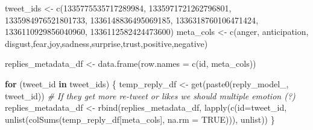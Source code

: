 \documentclass[
]{article}
\newenvironment{Shaded}{\begin{snugshade}}{\end{snugshade}}
\newcommand{\AttributeTok}[1]{\textcolor[rgb]{0.77,0.63,0.00}{#1}}
\newcommand{\CommentTok}[1]{\textcolor[rgb]{0.56,0.35,0.01}{\textit{#1}}}
\newcommand{\ConstantTok}[1]{\textcolor[rgb]{0.00,0.00,0.00}{#1}}
\newcommand{\ControlFlowTok}[1]{\textcolor[rgb]{0.13,0.29,0.53}{\textbf{#1}}}
\newcommand{\FunctionTok}[1]{\textcolor[rgb]{0.00,0.00,0.00}{#1}}
\newcommand{\NormalTok}[1]{#1}
\newcommand{\OtherTok}[1]{\textcolor[rgb]{0.56,0.35,0.01}{#1}}
\newcommand{\StringTok}[1]{\textcolor[rgb]{0.31,0.60,0.02}{#1}}
\begin{document}
\begin{Shaded}
\begin{Highlighting}[]
\NormalTok{tweet\_ids }\OtherTok{\textless{}{-}} \FunctionTok{c}\NormalTok{(}\StringTok{\textquotesingle{}1335775535717289984\textquotesingle{}}\NormalTok{, }\StringTok{\textquotesingle{}1335971721262796801\textquotesingle{}}\NormalTok{, }\StringTok{\textquotesingle{}1335984976521801733\textquotesingle{}}\NormalTok{, }\StringTok{\textquotesingle{}1336148836495069185\textquotesingle{}}\NormalTok{, }\StringTok{\textquotesingle{}1336318760106471424\textquotesingle{}}\NormalTok{, }\StringTok{\textquotesingle{}1336110929856040960\textquotesingle{}}\NormalTok{, }\StringTok{\textquotesingle{}1336112582424473600\textquotesingle{}}\NormalTok{)}
\NormalTok{meta\_cols }\OtherTok{\textless{}{-}} \FunctionTok{c}\NormalTok{(}\StringTok{\textquotesingle{}anger\textquotesingle{}}\NormalTok{, }\StringTok{\textquotesingle{}anticipation\textquotesingle{}}\NormalTok{, }\StringTok{\textquotesingle{}disgust\textquotesingle{}}\NormalTok{,}\StringTok{\textquotesingle{}fear\textquotesingle{}}\NormalTok{,}\StringTok{\textquotesingle{}joy\textquotesingle{}}\NormalTok{,}\StringTok{\textquotesingle{}sadness\textquotesingle{}}\NormalTok{,}\StringTok{\textquotesingle{}surprise\textquotesingle{}}\NormalTok{,}\StringTok{\textquotesingle{}trust\textquotesingle{}}\NormalTok{,}\StringTok{\textquotesingle{}positive\textquotesingle{}}\NormalTok{,}\StringTok{\textquotesingle{}negative\textquotesingle{}}\NormalTok{)}


\NormalTok{replies\_metadata\_df }\OtherTok{\textless{}{-}} \FunctionTok{data.frame}\NormalTok{(}\AttributeTok{row.names =} \FunctionTok{c}\NormalTok{(}\StringTok{\textquotesingle{}id\textquotesingle{}}\NormalTok{, meta\_cols))}

\ControlFlowTok{for}\NormalTok{ (tweet\_id }\ControlFlowTok{in}\NormalTok{ tweet\_ids) \{}
\NormalTok{  temp\_reply\_df }\OtherTok{\textless{}{-}} \FunctionTok{get}\NormalTok{(}\FunctionTok{paste0}\NormalTok{(}\StringTok{\textquotesingle{}reply\_model\_\textquotesingle{}}\NormalTok{, tweet\_id))}
  \CommentTok{\# If they get more re{-}tweet or likes we should multiple emotion (?)}
\NormalTok{  replies\_metadata\_df }\OtherTok{\textless{}{-}} \FunctionTok{rbind}\NormalTok{(replies\_metadata\_df, }\FunctionTok{lapply}\NormalTok{(}\FunctionTok{c}\NormalTok{(}\StringTok{\textquotesingle{}id\textquotesingle{}}\OtherTok{=}\NormalTok{tweet\_id, }\FunctionTok{unlist}\NormalTok{(}\FunctionTok{colSums}\NormalTok{(temp\_reply\_df[meta\_cols], }\AttributeTok{na.rm =} \ConstantTok{TRUE}\NormalTok{))), unlist)) }
\NormalTok{\} }


\end{Highlighting}
\end{Shaded}
\end{document}
